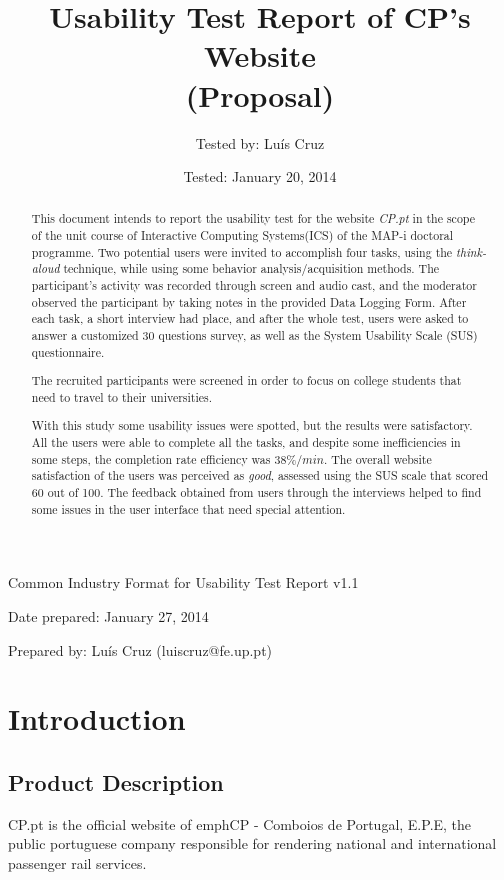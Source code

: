 \documentclass[a4paper]{article}
\title{Usability Test Report of CP's Website\\ (Proposal)}
\author[1]{Tested by: Luís  Cruz}
\affil[1]{MAP-i\\ Joint Doctoral Programme in Computer Science}
\date{Tested: January 20, 2014}
\begin{document}
\maketitle

Common Industry Format for Usability Test Report v1.1

Date prepared: January 27, 2014

Prepared by: Luís Cruz (luiscruz@fe.up.pt)

\begin{abstract}
	
	This document intends to report the usability test for the website \emph{CP.pt} in the scope of the unit course of Interactive Computing Systems(ICS) of the MAP-i doctoral programme. Two potential users were invited to accomplish four tasks, using the \emph{think-aloud} technique, while using some behavior analysis/acquisition methods. The participant's activity was recorded through screen and audio cast, and the moderator observed the participant by taking notes in the provided Data Logging Form. After each task, a short interview had place, and after the whole test, users were asked to answer a customized 30 questions survey, as well as the System Usability Scale (SUS) questionnaire.

The recruited participants were screened in order to focus on college students that need to travel to their universities. 

With this study some usability issues were spotted, but the results were satisfactory. All the users were able to complete all the tasks, and despite some inefficiencies in some steps, the completion rate efficiency was $38\%/min$.
The overall website satisfaction of the users was perceived as \emph{good}, assessed using the SUS scale that scored 60 out of 100. The feedback obtained from users through the interviews helped to find some issues in the user interface that need special attention.
\end{abstract}

\section{Introduction}
\subsection{Product Description}

CP.pt is the official website of emph{CP - Comboios de Portugal, E.P.E}, the public portuguese company responsible for rendering national and international passenger rail services.
\end{document}
